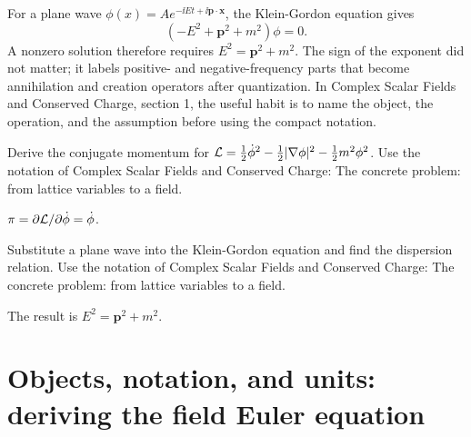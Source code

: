 \begin{example}
For a plane wave \(\phi(x)=Ae^{-\ii Et+\ii\bm p\cdot\bm x}\), the Klein-Gordon equation gives
\[
  (-E^2+\bm p^2+m^2)\phi=0.
\]
A nonzero solution therefore requires \(E^2=\bm p^2+m^2\).  The sign of the exponent did not matter; it labels positive- and negative-frequency parts that become annihilation and creation operators after quantization.  In Complex Scalar Fields and Conserved Charge, section 1, the useful habit is to name the object, the operation, and the assumption before using the compact notation.
\end{example}



\begin{exercise}
Derive the conjugate momentum for \(\mathcal L=\frac12\dot\phi^2-\frac12|\nabla\phi|^2-\frac12m^2\phi^2\).  Use the notation of Complex Scalar Fields and Conserved Charge: The concrete problem: from lattice variables to a field.
\begin{answer}
\(\pi=\partial\mathcal L/\partial\dot\phi=\dot\phi\).
\end{answer}
\end{exercise}

\begin{exercise}
Substitute a plane wave into the Klein-Gordon equation and find the dispersion relation.  Use the notation of Complex Scalar Fields and Conserved Charge: The concrete problem: from lattice variables to a field.
\begin{answer}
The result is \(E^2=\bm p^2+m^2\).
\end{answer}
\end{exercise}



\section{Objects, notation, and units: deriving the field Euler equation}













